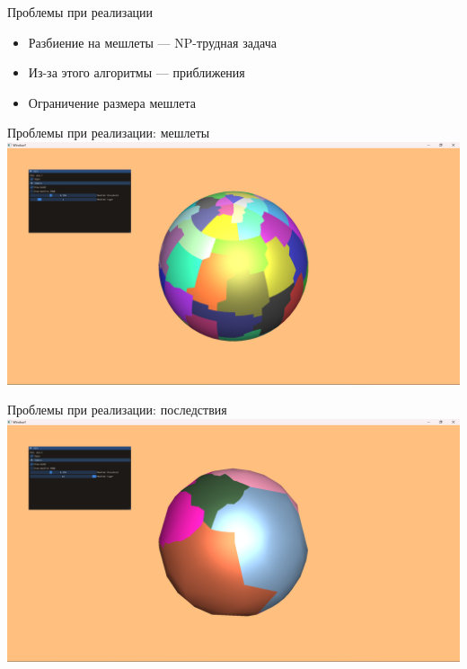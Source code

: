 \begin{frame}{Проблемы при реализации}
    \begin{itemize}
        \item Разбиение на мешлеты --- NP-трудная задача
        \item Из-за этого алгоритмы --- приближения
        \item Ограничение размера мешлета
    \end{itemize}
\end{frame}

\begin{frame}{Проблемы при реализации: мешлеты}
    \includegraphics[width=\textwidth]{sphere0.png}
\end{frame}

\begin{frame}{Проблемы при реализации: последствия}
    \includegraphics[width=\textwidth]{sphere1.png}
\end{frame}
